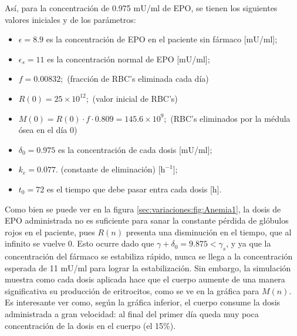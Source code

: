 Así, para la concentración de 0.975 mU/ml de EPO, se tienen los siguientes valores iniciales y de los parámetros:

\begin{itemize}
    \item $\epsilon = 8.9$ es la concentración de EPO en el paciente sin fármaco [mU/ml];
    \item $\epsilon_s = 11$ es la concentración normal de EPO [mU/ml];
    \item $f=0.00832;$ (fracción de RBC's eliminada cada día)
    \item $R(0) = 25\times 10^{12};$ (valor inicial de RBC's)
    \item $M(0) = R(0)\cdot f \cdot 0.809 = 145.6\times 10^{9};$ (RBC's eliminados por la médula ósea en el día 0)
    \item $\delta_0=0.975$ es la concentración de cada dosis [mU/ml];
    \item $k_e=0.077.$ (constante de eliminación) [$\textrm{h}^{-1}$];
    \item $t_0=72$ es el tiempo que debe pasar entra cada dosis [h].
\end{itemize}

Como bien se puede ver en la figura \ref{sec:variaciones:fig:Anemia1}, la dosis de EPO administrada no es suficiente para sanar la constante pérdida de glóbulos rojos en el paciente, pues $R(n)$ presenta una disminución en el tiempo, que al infinito se vuelve 0. Esto ocurre dado que $\gamma + \delta_0=9.875 < \gamma_s$, y ya que la concentración del fármaco se estabiliza rápido, nunca se llega a la concentración esperada de 11 mU/ml para lograr la estabilización. Sin embargo, la simulación muestra como cada dosis aplicada hace que el cuerpo aumente de una manera significativa su producción de eritrocitos, como se ve en la gráfica para $M(n)$. Es interesante ver como, según la gráfica inferior, el cuerpo consume la dosis administrada a gran velocidad: al final del primer día queda muy poca concentración de la dosis en el cuerpo (el 15$\%$).

